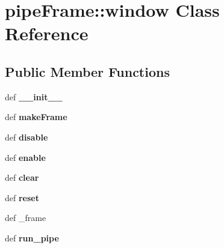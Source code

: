 \section{pipe\-Frame::window Class Reference}
\label{classpipeFrame_1_1window}
\subsection*{Public Member Functions}
\begin{CompactItemize}
\item 
def \textbf{\_\-\_\-init\_\-\_\-}\label{classpipeFrame_1_1window_13e65fc7ab9193f5bc329da08fcd4c60}

\item 
def \textbf{make\-Frame}\label{classpipeFrame_1_1window_861837594f13db6d2eb3442e6d01f1c1}

\item 
def \textbf{disable}\label{classpipeFrame_1_1window_0b36dfff8fe441034c614aaf8208c226}

\item 
def \textbf{enable}\label{classpipeFrame_1_1window_cec1cff7cd9347d559af418ea689dc96}

\item 
def \textbf{clear}\label{classpipeFrame_1_1window_92aa6dd93c83f76e31d97c2201b9317e}

\item 
def \textbf{reset}\label{classpipeFrame_1_1window_21a7918f8f1f72c19a82f16af2d65a03}

\item 
def {\bfprocess\_\-frame}
\item 
def \textbf{run\_\-pipe}\label{classpipeFrame_1_1window_d5ac12b11714aecdd31527ab8edbef25}

\end{CompactItemize}
